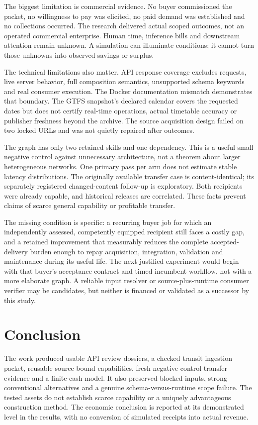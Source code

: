 \documentclass[11pt,letterpaper]{article}
\begin{document}
The biggest limitation is commercial evidence. No buyer commissioned the packet, no willingness
to pay was elicited, no paid demand was established and no collections occurred. The research
delivered actual scoped outcomes, not an operated commercial enterprise. Human time, inference
bills and downstream attention remain unknown. A simulation can illuminate conditions; it
cannot turn those unknowns into observed savings or surplus.

The technical limitations also matter. API response coverage excludes requests, live server
behavior, full composition semantics, unsupported schema keywords and real consumer execution.
The Docker documentation mismatch demonstrates that boundary. The GTFS snapshot's declared
calendar covers the requested dates but does not certify real-time operations, actual timetable
accuracy or publisher freshness beyond the archive. The source acquisition design failed on
two locked URLs and was not quietly repaired after outcomes.

The graph has only two retained skills and one dependency. This is a useful small negative
control against unnecessary architecture, not a theorem about larger heterogeneous networks.
One primary pass per arm does not estimate stable latency distributions. The originally available
transfer case is content-identical; its separately registered changed-content follow-up is exploratory.
Both recipients were already capable, and historical releases are correlated. These facts
prevent claims of scarce general capability or profitable transfer.

The missing condition is specific: a recurring buyer job for which an independently assessed,
competently equipped recipient still faces a costly gap, and a retained improvement that
measurably reduces the complete accepted-delivery burden enough to repay acquisition, integration,
validation and maintenance during its useful life. The next justified experiment would begin
with that buyer's acceptance contract and timed incumbent workflow, not with a more elaborate
graph. A reliable input resolver or source-plus-runtime consumer verifier may be candidates,
but neither is financed or validated as a successor by this study.

\section{Conclusion}

The work produced usable API review dossiers, a checked transit ingestion packet, reusable
source-bound capabilities, fresh negative-control transfer evidence and a finite-cash model.
It also preserved blocked inputs, strong conventional alternatives and a genuine schema-versus-runtime
scope failure. The tested assets do not establish scarce capability or a uniquely advantageous
construction method. The economic conclusion is reported at its demonstrated level in the
results, with no conversion of simulated receipts into actual revenue.
\end{document}
